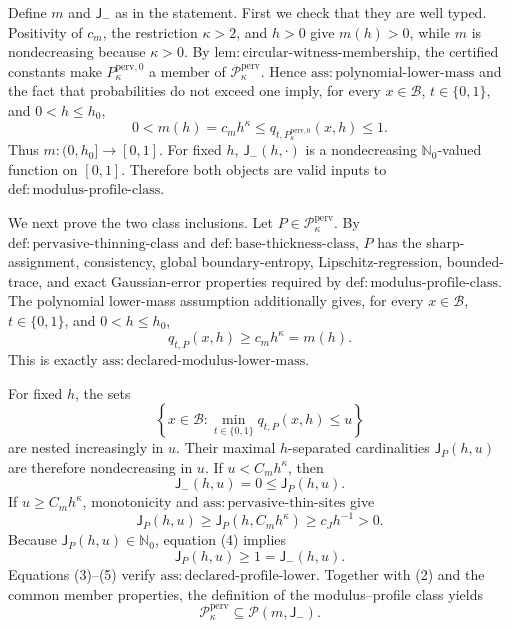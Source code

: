 Define \(m\) and \(\mathsf J_{-}\) as in the statement.  First we check that they are well typed.  Positivity of \(c_m\), the restriction \(\kappa>2\), and \(h>0\) give \(m(h)>0\), while \(m\) is nondecreasing because \(\kappa>0\).  By \(\mathrm{lem:circular\text{-}witness\text{-}membership}\), the certified constants make \(P_{\kappa}^{\mathrm{perv},0}\) a member of \(\mathcal P_{\kappa}^{\mathrm{perv}}\).  Hence \(\mathrm{ass:polynomial\text{-}lower\text{-}mass}\) and the fact that probabilities do not exceed one imply, for every \(x\in\mathcal B\), \(t\in\{0,1\}\), and \(0<h\le h_0\),
\[
 0<m(h)=c_mh^\kappa
 \le q_{t,P_{\kappa}^{\mathrm{perv},0}}(x,h)
 \le1. \tag{1}
\]
Thus \(m:(0,h_0]\to[0,1]\).  For fixed \(h\), \(\mathsf J_{-}(h,\cdot)\) is a nondecreasing \(\mathbb N_0\)-valued function on \([0,1]\).  Therefore both objects are valid inputs to \(\mathrm{def:modulus\text{-}profile\text{-}class}\).

We next prove the two class inclusions.  Let \(P\in\mathcal P_{\kappa}^{\mathrm{perv}}\).  By \(\mathrm{def:pervasive\text{-}thinning\text{-}class}\) and \(\mathrm{def:base\text{-}thickness\text{-}class}\), \(P\) has the sharp-assignment, consistency, global boundary-entropy, Lipschitz-regression, bounded-trace, and exact Gaussian-error properties required by \(\mathrm{def:modulus\text{-}profile\text{-}class}\).  The polynomial lower-mass assumption additionally gives, for every \(x\in\mathcal B\), \(t\in\{0,1\}\), and \(0<h\le h_0\),
\[
 q_{t,P}(x,h)\ge c_mh^\kappa=m(h). \tag{2}
\]
This is exactly \(\mathrm{ass:declared\text{-}modulus\text{-}lower\text{-}mass}\).

For fixed \(h\), the sets
\[
 \left\{x\in\mathcal B:
 \min_{t\in\{0,1\}}q_{t,P}(x,h)\le u\right\}
\]
are nested increasingly in \(u\).  Their maximal \(h\)-separated cardinalities \(\mathsf J_P(h,u)\) are therefore nondecreasing in \(u\).  If \(u<C_mh^\kappa\), then
\[
 \mathsf J_{-}(h,u)=0\le\mathsf J_P(h,u). \tag{3}
\]
If \(u\ge C_mh^\kappa\), monotonicity and \(\mathrm{ass:pervasive\text{-}thin\text{-}sites}\) give
\[
 \mathsf J_P(h,u)
 \ge \mathsf J_P(h,C_mh^\kappa)
 \ge c_Jh^{-1}>0. \tag{4}
\]
Because \(\mathsf J_P(h,u)\in\mathbb N_0\), equation (4) implies
\[
 \mathsf J_P(h,u)\ge1=\mathsf J_{-}(h,u). \tag{5}
\]
Equations (3)--(5) verify \(\mathrm{ass:declared\text{-}profile\text{-}lower}\).  Together with (2) and the common member properties, the definition of the modulus--profile class yields
\[
 \mathcal P_{\kappa}^{\mathrm{perv}}
 \subseteq\mathcal P(m,\mathsf J_{-}). \tag{6}
\]


